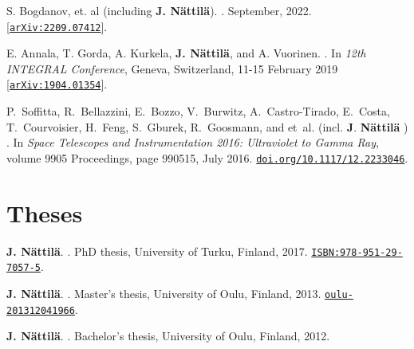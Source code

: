 \documentclass[letterpaper, onecolumn, 11pt]{article}
\begin{document}
\begin{thebibliography}{1}
\vspace{-1cm}

S. Bogdanov, et. al (including \textbf{J. N\"attil\"a}).
.
\newblock September, 2022.
[\href{https://arxiv.org/abs/2209.07412}{\nolinkurl{arXiv:2209.07412}}].

E. {Annala}, T. {Gorda}, A. {Kurkela}, \textbf{J. {N{\"a}ttil{\"a}}}, and A. {Vuorinen}.
.
\newblock In {\em 12th INTEGRAL Conference}, Geneva, Switzerland, 11-15 February 2019
[\href{https://arxiv.org/abs/1904.01354}{\nolinkurl{arXiv:1904.01354}}].

P.~{Soffitta}, R.~{Bellazzini}, E.~{Bozzo}, V.~{Burwitz}, A.~{Castro-Tirado},
  E.~{Costa}, T.~{Courvoisier}, H.~{Feng}, S.~{Gburek}, R.~{Goosmann}, and
  et~al. (incl. \textbf{J}. \textbf{{N{\"a}ttil{\"a}}} )
.
\newblock In {\em Space Telescopes and Instrumentation 2016: Ultraviolet to
  Gamma Ray}, volume 9905 Proceedings, page 990515, July 2016.
\href{https://doi.org/10.1117/12.2233046}{\nolinkurl{doi.org/10.1117/12.2233046}}.
\end{thebibliography}



\vspace{1cm}
\section*{Theses}
\vspace{-1cm}

%
\begin{thebibliography}{3}

\textbf{J. N\"attil\"a}.
.
\newblock PhD thesis, University of Turku, Finland, 2017. \href{http://urn.fi/URN:ISBN:978-951-29-7057-5}{\nolinkurl{ISBN:978-951-29-7057-5}}.

\textbf{J. N\"attil\"a}.
.
\newblock Master's thesis, University of Oulu, Finland, 2013. \href{http://urn.fi/URN:NBN:fi:oulu-201312041966}{\nolinkurl{oulu-201312041966}}.

\textbf{J. N\"attil\"a}.
.
\newblock Bachelor's thesis, University of Oulu, Finland, 2012.

\end{thebibliography}
\end{document}
